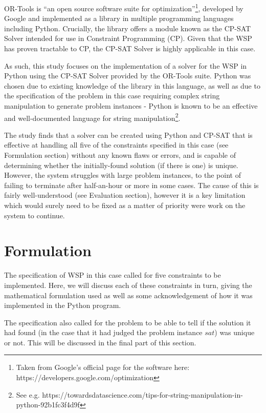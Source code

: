 \documentclass[11pt]{article}
\begin{document}
		OR-Tools is ``an open source software suite for optimization''\footnote{Taken from Google's official page for the software here: https://developers.google.com/optimization},
		developed by Google and implemented as a library in multiple programming languages including Python.
		Crucially, the library offers a module known as the CP-SAT Solver intended for
		use in Constraint Programming (CP). Given that the WSP has proven tractable to
		CP\cite{benoist02}, the CP-SAT Solver is highly applicable in this case.

		As such, this study focuses on the implementation of a solver for the WSP
		in Python using the CP-SAT Solver provided by the OR-Tools suite. Python
		was chosen due to existing knowledge of the library in this language,
		as well as due to the specification of the problem in this case requiring
		complex string manipulation to generate problem instances - Python is
		known to be an effective and well-documented language for string
		manipulation\footnote{See e.g. https://towardsdatascience.com/tips-for-string-manipulation-in-python-92b1fc3f4d9f}.

		The study finds that a solver can be created using Python and CP-SAT that
		is effective at handling all five of the constraints specified in this case (see Formulation section)
		without any known flaws or errors, and is capable of determining whether
		the initially-found solution (if there is one) is unique. However, the
		system struggles with large problem instances, to the point of failing to
		terminate after half-an-hour or more in some cases. The cause of this is
		fairly well-understood (see Evaluation section), however it is a key limitation
		which would surely need to be fixed as a matter of priority were work on
		the system to continue.

	\section{Formulation}

		The specification of WSP in this case called for five constraints to be implemented.
		Here, we will discuss each of these constraints in turn, giving the mathematical
		formulation used as well as some acknowledgement of how it was implemented in the
		Python program.

		The specification also called for the problem to be able to tell if the solution
		it had found (in the case that it had judged the problem instance \(sat\)) was
		unique or not. This will be discussed in the final part of this section.
\end{document}
